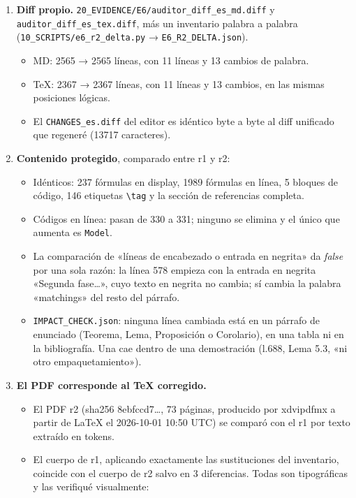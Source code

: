 \documentclass[
]{article}
\providecommand{\tightlist}{%
  \setlength{\itemsep}{0pt}\setlength{\parskip}{0pt}}
\begin{document}
\begin{enumerate}
\def\labelenumi{\arabic{enumi}.}
\tightlist
\item
  \textbf{Diff propio.}
  \texttt{20\_EVIDENCE/E6/auditor\_diff\_es\_md.diff} y
  \texttt{auditor\_diff\_es\_tex.diff}, más un inventario palabra a
  palabra (\texttt{10\_SCRIPTS/e6\_r2\_delta.py} →
  \texttt{E6\_R2\_DELTA.json}).

  \begin{itemize}
  \tightlist
  \item
    MD: 2565 → 2565 líneas, con 11 líneas y 13 cambios de palabra.
  \item
    TeX: 2367 → 2367 líneas, con 11 líneas y 13 cambios, en las mismas
    posiciones lógicas.
  \item
    El \texttt{CHANGES\_es.diff} del editor es idéntico byte a byte al
    diff unificado que regeneré (13717 caracteres).
  \end{itemize}
\item
  \textbf{Contenido protegido}, comparado entre r1 y r2:

  \begin{itemize}
  \tightlist
  \item
    Idénticos: 237 fórmulas en display, 1989 fórmulas en línea, 5
    bloques de código, 146 etiquetas \texttt{\textbackslash{}tag} y la
    sección de referencias completa.
  \item
    Códigos en línea: pasan de 330 a 331; ninguno se elimina y el único
    que aumenta es \texttt{\textasciigrave{}Model\textasciigrave{}}.
  \item
    La comparación de «líneas de encabezado o entrada en negrita» da
    \emph{false} por una sola razón: la línea 578 empieza con la entrada
    en negrita «Segunda fase\ldots», cuyo texto en negrita no cambia; sí
    cambia la palabra «matchings» del resto del párrafo.
  \item
    \texttt{IMPACT\_CHECK.json}: ninguna línea cambiada está en un
    párrafo de enunciado (Teorema, Lema, Proposición o Corolario), en
    una tabla ni en la bibliografía. Una cae dentro de una demostración
    (l.688, Lema 5.3, «ni otro empaquetamiento»).
  \end{itemize}
\item
  \textbf{El PDF corresponde al TeX corregido.}

  \begin{itemize}
  \tightlist
  \item
    El PDF r2 (sha256 8ebfccd7\ldots, 73 páginas, producido por
    xdvipdfmx a partir de LaTeX el 2026-10-01 10:50 UTC) se comparó con
    el r1 por texto extraído en tokens.
  \item
    El cuerpo de r1, aplicando exactamente las sustituciones del
    inventario, coincide con el cuerpo de r2 salvo en 3 diferencias.
    Todas son tipográficas y las verifiqué visualmente:


\end{itemize}
\end{enumerate}
\end{document}
